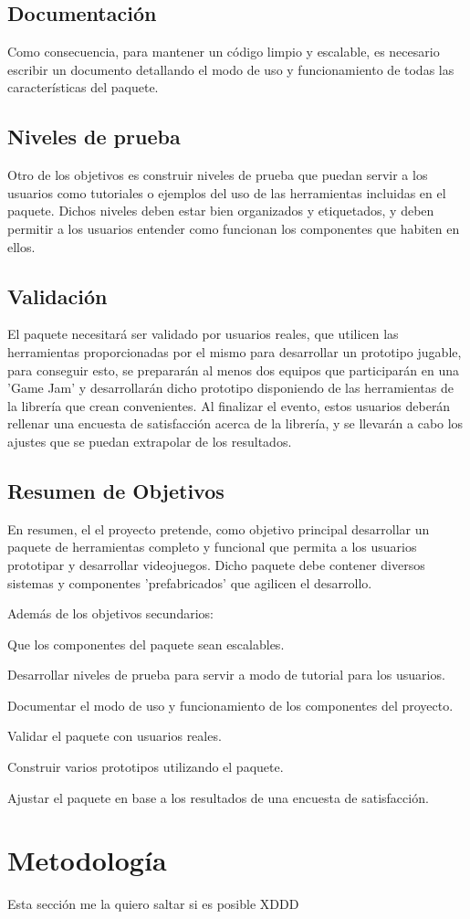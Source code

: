 \subsection{Documentación}
Como consecuencia, para mantener un código limpio y escalable, es necesario escribir un documento detallando el modo de uso y funcionamiento de todas las características del paquete.

\subsection{Niveles de prueba}
Otro de los objetivos es construir niveles de prueba que puedan servir a los usuarios como tutoriales o ejemplos del uso de las herramientas incluidas en el paquete. Dichos 
 niveles deben estar bien organizados y etiquetados, y deben permitir a los usuarios entender como funcionan los componentes que habiten en ellos.

\subsection{Validación}

El paquete necesitará ser validado por usuarios reales, que utilicen las herramientas proporcionadas por el mismo para desarrollar un prototipo jugable, para conseguir esto,
 se prepararán al menos dos equipos que participarán en una 'Game Jam' y desarrollarán dicho prototipo disponiendo de las herramientas de la librería que crean convenientes.
 Al finalizar el evento, estos usuarios deberán rellenar una encuesta de satisfacción acerca de la librería, y se llevarán a cabo los ajustes que se puedan extrapolar de
 los resultados.  

\subsection{Resumen de Objetivos}

En resumen, el el proyecto pretende, como objetivo principal desarrollar un paquete de herramientas completo y funcional que permita a los usuarios prototipar y 
 desarrollar videojuegos. Dicho paquete debe contener diversos sistemas y componentes 'prefabricados' que agilicen el desarrollo. 

Además de los objetivos secundarios:
\begin{compactitem}
  \item Que los componentes del paquete sean escalables.
  \item Desarrollar niveles de prueba para servir a modo de tutorial para los usuarios.
  \item Documentar el modo de uso y funcionamiento de los componentes del proyecto.
  \item Validar el paquete con usuarios reales.
  \item Construir varios prototipos utilizando el paquete.
  \item Ajustar el paquete en base a los resultados de una encuesta de satisfacción.
\end{compactitem}

\section{Metodología}

Esta sección me la quiero saltar si es posible XDDD